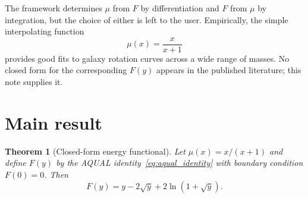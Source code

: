 \documentclass[twocolumn]{iopjournal}
\newtheorem{theorem}[lemma]{Theorem}
\theoremstyle{definition}
\begin{document}
\noindent
The framework determines $\mu$ from $F$ by differentiation and $F$
from $\mu$ by integration, but the choice of either is left to the
user.  Empirically, the simple interpolating
function~\cite{FamaeyMcGaugh2012}
\begin{equation}
  \mu(x) = \frac{x}{x+1}
  \label{eq:simple_mu}
\end{equation}
provides good fits to galaxy rotation curves across a wide range of
masses.  No closed form for the corresponding $F(y)$ appears in
the published literature; this note supplies it.


\section*{Main result}

\begin{theorem}[Closed-form energy functional]
\label{thm:closed_form}
Let $\mu(x) = x/(x+1)$ and define $F(y)$ by the AQUAL
identity~\eqref{eq:aqual_identity} with boundary condition
$F(0) = 0$.  Then
\begin{equation}
  \boxed{F(y) = y - 2\sqrt{y} + 2\ln(1 + \sqrt{y}).}
  \label{eq:F_closed_form}
\end{equation}
\end{theorem}
\end{document}
